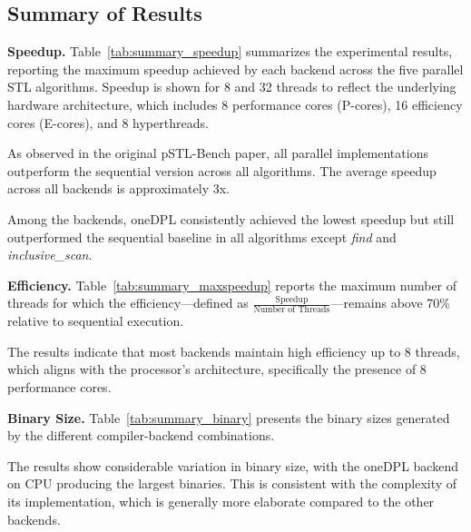 \documentclass[sigconf]{acmart}
\newcommand{\mypar}[1]{{\bf #1.}}
\begin{document}
\subsection{Summary of Results}

\mypar{Speedup}
Table~\ref{tab:summary_speedup} summarizes the experimental results, reporting
the maximum speedup achieved by each backend across the five parallel STL
algorithms. Speedup is shown for 8 and 32 threads to reflect the underlying
hardware architecture, which includes 8 performance cores (P-cores),
16 efficiency cores (E-cores), and 8 hyperthreads.

As observed in the original pSTL-Bench paper, all parallel implementations
outperform the sequential version across all algorithms. The average speedup
across all backends is approximately 3x.

Among the backends, oneDPL consistently achieved the lowest speedup but still
outperformed the sequential baseline in all algorithms except \textit{find} and
\textit{inclusive\_scan}.

\mypar{Efficiency}
Table~\ref{tab:summary_maxspeedup} reports the maximum number of threads for
which the efficiency—defined as
$\frac{\text{Speedup}}{\text{Number of Threads}}$—remains above 70\%
relative to sequential execution.

The results indicate that most backends maintain high efficiency up to 8
threads, which aligns with the processor's architecture, specifically the
presence of 8 performance cores.

\mypar{Binary Size}
Table~\ref{tab:summary_binary} presents the binary sizes generated by the
different compiler-backend combinations.

The results show considerable variation in binary size, with the oneDPL backend
on CPU producing the largest binaries. This is consistent with the complexity
of its implementation, which is generally more elaborate compared to the other
backends.
\end{document}
